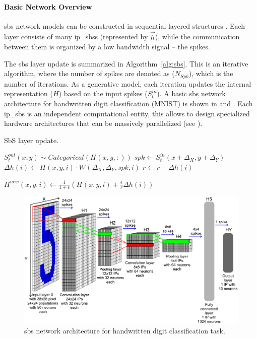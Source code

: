 \paragraph{Basic Network Overview}

\gls{sbs} network models can be constructed in sequential layered structures \cite{rotermund2019Backpropagation}. Each layer consists of many \glspl{ip_sbs} (represented by $\vec{h}$), while the communication between them is organized by a low bandwidth signal -- the spikes.

The \gls{sbs} layer update is summarized in Algorithm~\ref{alg:sbs}. This is an iterative algorithm, where the number of spikes are denoted as ($N_{Spk}$), which is the number of iterations. As a generative model, each iteration updates the internal representation ($H$) based on the input spikes ($S^{in}_t$). A basic \gls{sbs} network architecture for handwritten digit classification (MNIST) is shown in  and . Each \gls{ip_sbs} is an independent computational entity, this allows to design specialized hardware architectures that can be massively parallelized (see ).


\begin{algorithm}
	\caption{SbS layer update.}\label{alg:sbs}
	
	\begin{algorithmic}[1]
		\STATE $S^{out}_t(x, y) \sim Categorical( H^{}(x, y, :) ) $
		\STATE $spk \leftarrow S^{in}_t(x + \Delta_X , y + \Delta_Y)$
		\STATE $\Delta h(i)
		\leftarrow H^{}(x, y,  i) \cdot W^{}(\Delta_X, \Delta_Y, spk, i)$
		\STATE $r \leftarrow r + \Delta h(i)$
		\ENDFOR
		
		\STATE $H^{new}(x, y, i) \leftarrow \frac{1}{1+\epsilon} \left( H^{}(x, y, i) + \frac{\epsilon}{r} \Delta h(i) \right) $              
		\ENDFOR
		\ENDFOR
		\ENDFOR
		\ENDFOR
	\end{algorithmic} 
\end{algorithm}

\begin{figure}
	\centering
	\includegraphics[width=0.5\columnwidth]{./chapters/sbs_accelerator/figures/sbs_network.pdf}
	\caption{\gls{sbs} network architecture for handwritten digit classification task.}
	\label{fig:sbs_network}
\end{figure}


